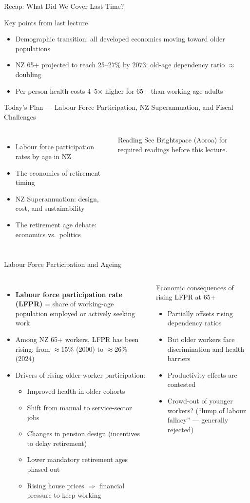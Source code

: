 \documentclass[aspectratio=169, 12pt]{beamer}
\newcommand{\recapslide}[1]{%
  \begin{frame}{Recap: What Did We Cover Last Time?}
    \begin{block}{Key points from last lecture}
      \begin{itemize}#1\end{itemize}
    \end{block}
  \end{frame}}
\newcommand{\planslide}[2]{%
  \begin{frame}{Today's Plan — #1}
    \begin{columns}
      \column{0.6\textwidth}
      \begin{itemize}#2\end{itemize}
      \column{0.38\textwidth}
      \begin{alertblock}{Reading}
        \footnotesize See Brightspace (Aoroa) for required readings before this lecture.
      \end{alertblock}
    \end{columns}
  \end{frame}}
\begin{document}
\recapslide{
  \item Demographic transition: all developed economies moving toward older populations
  \item NZ 65+ projected to reach 25--27\% by 2073; old-age dependency ratio $\approx$doubling
  \item Per-person health costs 4--5$\times$ higher for 65+ than working-age adults
}

\planslide{Labour Force Participation, NZ Superannuation, and Fiscal Challenges}{
  \item Labour force participation rates by age in NZ
  \item The economics of retirement timing
  \item NZ Superannuation: design, cost, and sustainability
  \item The retirement age debate: economics vs.\ politics
}

\begin{frame}{Labour Force Participation and Ageing}
  \begin{columns}
      \begin{itemize}
        \item \textbf{Labour force participation rate (LFPR)} = share of working-age population
              employed or actively seeking work
        \item Among NZ 65+ workers, LFPR has been rising: from $\approx$15\% (2000) to
              $\approx$26\% (2024)
        \item Drivers of rising older-worker participation:
        \begin{itemize}
          \item Improved health in older cohorts
          \item Shift from manual to service-sector jobs
          \item Changes in pension design (incentives to delay retirement)
          \item Lower mandatory retirement ages phased out
          \item Rising house prices $\Rightarrow$ financial pressure to keep working
        \end{itemize}
      \end{itemize}
      \begin{alertblock}{Economic consequences of rising LFPR at 65+}
        \begin{itemize}
          \item Partially offsets rising dependency ratios
          \item But older workers face discrimination and health barriers
          \item Productivity effects are contested
          \item Crowd-out of younger workers? (``lump of labour fallacy'' --- generally rejected)
        \end{itemize}
      \end{alertblock}
  \end{columns}
\end{frame}
\end{document}
